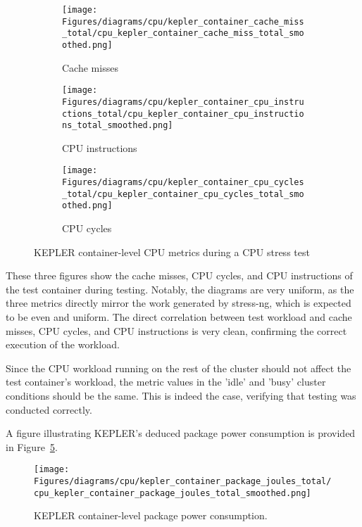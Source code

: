 \begin{figure}[H]
    \centering
    \begin{subfigure}{0.49\textwidth}
        \texttt{[image: Figures/diagrams/cpu/kepler\_container\_cache\_miss\_total/cpu\_kepler\_container\_cache\_miss\_total\_smoothed.png]}
        \caption{Cache misses}
        \label{fig:cpu_kepler_container_cache_miss_total}
    \end{subfigure}
    \begin{subfigure}{0.49\textwidth}
        \texttt{[image: Figures/diagrams/cpu/kepler\_container\_cpu\_instructions\_total/cpu\_kepler\_container\_cpu\_instructions\_total\_smoothed.png]}
        \caption{CPU instructions}
        \label{fig:cpu_kepler_container_cpu_instructions_total}
    \end{subfigure}
    \begin{subfigure}{1\textwidth}
        \texttt{[image: Figures/diagrams/cpu/kepler\_container\_cpu\_cycles\_total/cpu\_kepler\_container\_cpu\_cycles\_total\_smoothed.png]}
        \caption{CPU cycles}
        \label{fig:cpu_kepler_container_cpu_cycles_total}
    \end{subfigure}
    \caption[Container-Level CPU Metrics]{KEPLER container-level CPU metrics during a CPU stress test}
\end{figure}

These three figures show the cache misses, CPU cycles, and CPU instructions of the test container during testing. Notably, the diagrams are very uniform, as the three metrics directly mirror the work generated by stress-ng, which is expected to be even and uniform. The direct correlation between test workload and cache misses, CPU cycles, and CPU instructions is very clean, confirming the correct execution of the workload.

Since the CPU workload running on the rest of the cluster should not affect the test container’s workload, the metric values in the 'idle' and 'busy' cluster conditions should be the same. This is indeed the case, verifying that testing was conducted correctly.

A figure illustrating KEPLER's deduced package power consumption is provided in Figure~\ref{fig:cpu_kepler_container_package_joules_total}.

\begin{figure}[H]
    \centering
    \texttt{[image: Figures/diagrams/cpu/kepler\_container\_package\_joules\_total/cpu\_kepler\_container\_package\_joules\_total\_smoothed.png]}
    \caption[Container Package Power]{KEPLER container-level package power consumption.}
    \label{fig:cpu_kepler_container_package_joules_total}
\end{figure}

